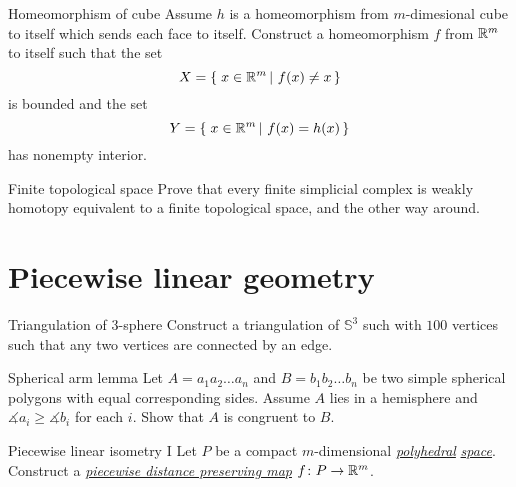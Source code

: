 \documentclass[twoside]{book}
\begin{document}
{\begin{pr}{}{Homeomorphism of cube}\label{Homeomorphism of cube}
Assume $h$ is a homeomorphism from $m$-dimesional cube to itself 
which sends each face to itself.
Construct a homeomorphism $f$ from $\mathbb{R}^m$ to itself
such that 
the set 
\[X=\set{x\in\RR^m}{f(x)\ne x}\] is bounded 
and 
the set 
\[Y=\set{x\in\RR^m}{f(x)=h(x)}\]
 has nonempty interior.    
\end{pr}


\begin{pr}{\easy}{Finite topological space}\label{Finite topological space}
Prove that every finite simplicial complex is weakly homotopy equivalent 
to a finite topological space, 
and the other way around. 
\end{pr}












\chapter{Piecewise linear geometry}




\begin{pr}{}{Triangulation of 3-sphere}\label{4-poly}
Construct a triangulation of $\mathbb{S}^3$ 
such with $100$ vertices
such that any two vertices are connected by an edge.
\end{pr}

\begin{pr}{}{Spherical arm lemma}\label{Spherical arm lemma}
Let $A=a_1a_2\dots a_n$ and $B=b_1b_2\dots b_n$ be two simple spherical polygons 
with equal corresponding sides.
Assume $A$ lies in a hemisphere and $\measuredangle a_i\ge\measuredangle b_i$ for each $i$.
Show that $A$ is congruent to $B$.
\end{pr}



\begin{pr}{}{Piecewise linear isometry {\rm I}} \label{Piecewise linear isometry I}
Let $P$ be a compact $m$-dimensional 
\hyperref[Polyhedral space]{\emph{polyhedral}}
\hyperref[Polyhedral space]{\emph{space}}. 
Construct a 
\hyperref[Piecewise distance preserving map]{\emph{piecewise distance preserving map}} 
$f\colon P\to \mathbb{R}^m$.
\end{pr}

}
\end{document}
